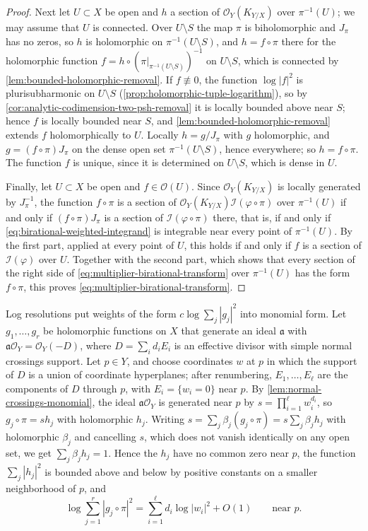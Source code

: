 \begin{proof}
Next let $U\subset X$ be open and $h$ a section of $\mathcal O_Y(K_{Y/X})$ over $\pi^{-1}(U)$; we may assume that $U$ is connected. Over $U\setminus S$ the map $\pi$ is biholomorphic and $J_\pi$ has no zeros, so $h$ is holomorphic on $\pi^{-1}(U\setminus S)$, and $h=f\circ\pi$ there for the holomorphic function $f=h\circ(\pi|_{\pi^{-1}(U\setminus S)})^{-1}$ on $U\setminus S$, which is connected by \cref{lem:bounded-holomorphic-removal}. If $f\not\equiv0$, the function $\log|f|^2$ is plurisubharmonic on $U\setminus S$ (\cref{prop:holomorphic-tuple-logarithm}), so by \cref{cor:analytic-codimension-two-psh-removal} it is locally bounded above near $S$; hence $f$ is locally bounded near $S$, and \cref{lem:bounded-holomorphic-removal} extends $f$ holomorphically to $U$. Locally $h=g/J_\pi$ with $g$ holomorphic, and $g=(f\circ\pi)J_\pi$ on the dense open set $\pi^{-1}(U\setminus S)$, hence everywhere; so $h=f\circ\pi$. The function $f$ is unique, since it is determined on $U\setminus S$, which is dense in $U$.

Finally, let $U\subset X$ be open and $f\in\mathcal O(U)$. Since $\mathcal O_Y(K_{Y/X})$ is locally generated by $J_\pi^{-1}$, the function $f\circ\pi$ is a section of $\mathcal O_Y(K_{Y/X})\mathcal I(\varphi\circ\pi)$ over $\pi^{-1}(U)$ if and only if $(f\circ\pi)J_\pi$ is a section of $\mathcal I(\varphi\circ\pi)$ there, that is, if and only if \eqref{eq:birational-weighted-integrand} is integrable near every point of $\pi^{-1}(U)$. By the first part, applied at every point of $U$, this holds if and only if $f$ is a section of $\mathcal I(\varphi)$ over $U$. Together with the second part, which shows that every section of the right side of \eqref{eq:multiplier-birational-transform} over $\pi^{-1}(U)$ has the form $f\circ\pi$, this proves \eqref{eq:multiplier-birational-transform}.
\end{proof}

Log resolutions put weights of the form $c\log\sum_j|g_j|^2$ into monomial form. Let $g_1,\ldots,g_r$ be holomorphic functions on $X$ that generate an ideal $\mathfrak a$ with $\mathfrak a\mathcal O_Y=\mathcal O_Y(-D)$, where $D=\sum_id_iE_i$ is an effective divisor with simple normal crossings support. Let $p\in Y$, and choose coordinates $w$ at $p$ in which the support of $D$ is a union of coordinate hyperplanes; after renumbering, $E_1,\ldots,E_\ell$ are the components of $D$ through $p$, with $E_i=\{w_i=0\}$ near $p$. By \cref{lem:normal-crossings-monomial}, the ideal $\mathfrak a\mathcal O_Y$ is generated near $p$ by $s=\prod_{i=1}^{\ell}w_i^{d_i}$, so $g_j\circ\pi=sh_j$ with holomorphic $h_j$. Writing $s=\sum_j\beta_j(g_j\circ\pi)=s\sum_j\beta_jh_j$ with holomorphic $\beta_j$ and cancelling $s$, which does not vanish identically on any open set, we get $\sum_j\beta_jh_j=1$. Hence the $h_j$ have no common zero near $p$, the function $\sum_j|h_j|^2$ is bounded above and below by positive constants on a smaller neighborhood of $p$, and
\begin{equation}\label{eq:log-resolution-local-form}
 \log\sum_{j=1}^r|g_j\circ\pi|^2=\sum_{i=1}^{\ell}d_i\log|w_i|^2+O(1)\qquad\text{near }p.
\end{equation}

